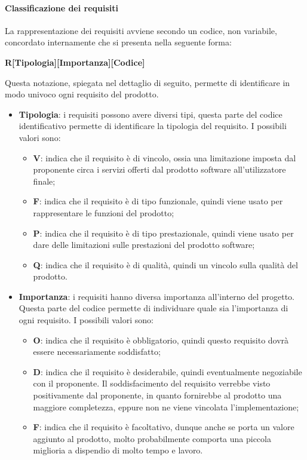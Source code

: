 \paragraph{Classificazione dei requisiti}
La rappresentazione dei requisiti avviene secondo un codice, non variabile, concordato internamente che si presenta nella seguente forma:

\begin{center}
    \textbf{R[Tipologia][Importanza][Codice]}
\end{center}

Questa notazione, spiegata nel dettaglio di seguito, permette di identificare in modo univoco ogni requisito del prodotto.\\
\begin{itemize}
    \item \textbf{Tipologia}: i requisiti possono avere diversi tipi, questa parte del codice identificativo permette di
    identificare la tipologia del requisito. I possibili valori sono:
    \begin{itemize}
        \item \textbf{V}: indica che il requisito è di vincolo, ossia una limitazione imposta dal
        proponente circa i servizi offerti dal prodotto software all'utilizzatore finale;
        \item \textbf{F}: indica che il requisito è di tipo funzionale, quindi viene usato per
        rappresentare le funzioni del prodotto;
        \item \textbf{P}: indica che il requisito è di tipo prestazionale, quindi viene usato per dare
        delle limitazioni sulle prestazioni del prodotto software;
        \item \textbf{Q}: indica che il requisito è di qualità, quindi un vincolo sulla qualità del prodotto.
    \end{itemize}
    \item \textbf{Importanza}: i requisiti hanno diversa importanza all'interno del progetto. Questa parte del codice
    permette di individuare quale sia l'importanza di ogni requisito. I possibili valori sono:
    \begin{itemize}
        \item \textbf{O}: indica che il requisito è obbligatorio, quindi questo requisito dovrà essere necessariamente
        soddisfatto;
        \item \textbf{D}: indica che il requisito è desiderabile, quindi eventualmente negoziabile con il proponente.
        Il soddisfacimento del requisito verrebbe visto positivamente dal proponente, in quanto fornirebbe al prodotto
        una maggiore completezza, eppure non ne viene vincolata l'implementazione;
        \item \textbf{F}: indica che il requisito è facoltativo, dunque anche se porta un valore aggiunto al prodotto,
        molto probabilmente comporta una piccola miglioria a dispendio di molto tempo e lavoro.
    \end{itemize}


\end{itemize}
